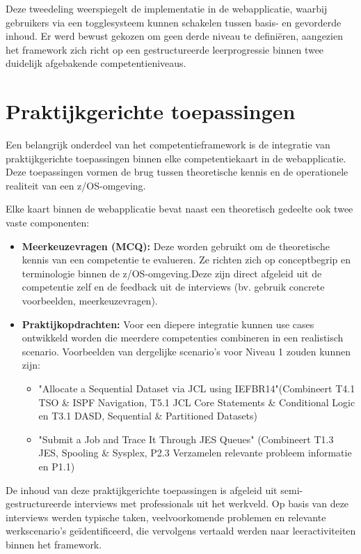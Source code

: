 Deze tweedeling weerspiegelt de implementatie in de webapplicatie, waarbij gebruikers via een togglesysteem kunnen schakelen tussen basis- en gevorderde inhoud. Er werd bewust gekozen om geen derde niveau te definiëren, aangezien het framework zich richt op een gestructureerde leerprogressie binnen twee duidelijk afgebakende competentieniveaus.

\section{Praktijkgerichte toepassingen}

Een belangrijk onderdeel van het competentieframework is de integratie van praktijkgerichte toepassingen binnen elke competentiekaart in de webapplicatie. Deze toepassingen vormen de brug tussen theoretische kennis en de operationele realiteit van een z/OS-omgeving.

Elke kaart binnen de webapplicatie bevat naast een theoretisch gedeelte ook twee vaste componenten:
\begin{itemize}
	\item \textbf{Meerkeuzevragen (MCQ):} Deze worden gebruikt om de theoretische kennis van een competentie te evalueren. Ze richten zich op conceptbegrip en terminologie binnen de z/OS-omgeving.Deze zijn direct afgeleid uit de competentie zelf en de feedback uit de
	interviews (bv. gebruik concrete voorbeelden, meerkeuzevragen).
	
	\item \textbf{Praktijkopdrachten:} Voor een diepere integratie kunnen use cases ontwikkeld worden die meerdere competenties combineren in een realistisch scenario. Voorbeelden van dergelijke scenario’s voor Niveau 1 zouden kunnen zijn:
		\begin{itemize}
			\item "Allocate a Sequential Dataset via JCL using IEFBR14"(Combineert T4.1 TSO & ISPF Navigation, T5.1 JCL Core Statements & Conditional Logic en T3.1 DASD, Sequential & Partitioned Datasets)
			\item "Submit a Job and Trace It Through JES Queues" (Combineert T1.3 JES, Spooling & Sysplex, P2.3 Verzamelen relevante probleem informatie en P1.1)
		\end{itemize}
\end{itemize}

De inhoud van deze praktijkgerichte toepassingen is afgeleid uit semi-gestructureerde interviews met professionals uit het werkveld. Op basis van deze interviews werden typische taken, veelvoorkomende problemen en relevante werkscenario's geïdentificeerd, die vervolgens vertaald werden naar leeractiviteiten binnen het framework.

